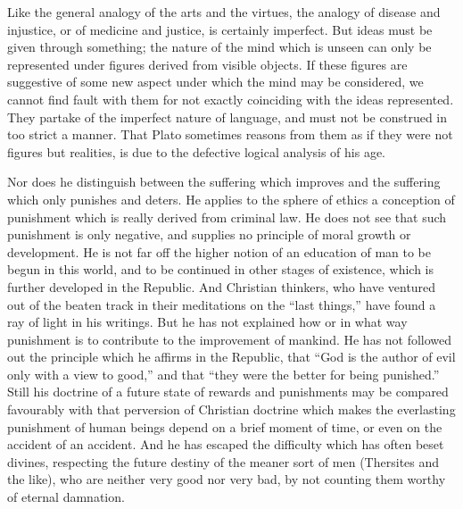 \documentclass[11pt,letter]{article}
\begin{document}
\par  Like the general analogy of the arts and the virtues, the analogy of disease and injustice, or of medicine and justice, is certainly imperfect. But ideas must be given through something; the nature of the mind which is unseen can only be represented under figures derived from visible objects. If these figures are suggestive of some new aspect under which the mind may be considered, we cannot find fault with them for not exactly coinciding with the ideas represented. They partake of the imperfect nature of language, and must not be construed in too strict a manner. That Plato sometimes reasons from them as if they were not figures but realities, is due to the defective logical analysis of his age.

\par  Nor does he distinguish between the suffering which improves and the suffering which only punishes and deters. He applies to the sphere of ethics a conception of punishment which is really derived from criminal law. He does not see that such punishment is only negative, and supplies no principle of moral growth or development. He is not far off the higher notion of an education of man to be begun in this world, and to be continued in other stages of existence, which is further developed in the Republic. And Christian thinkers, who have ventured out of the beaten track in their meditations on the “last things,” have found a ray of light in his writings. But he has not explained how or in what way punishment is to contribute to the improvement of mankind. He has not followed out the principle which he affirms in the Republic, that “God is the author of evil only with a view to good,” and that “they were the better for being punished.” Still his doctrine of a future state of rewards and punishments may be compared favourably with that perversion of Christian doctrine which makes the everlasting punishment of human beings depend on a brief moment of time, or even on the accident of an accident. And he has escaped the difficulty which has often beset divines, respecting the future destiny of the meaner sort of men (Thersites and the like), who are neither very good nor very bad, by not counting them worthy of eternal damnation.
\end{document}
